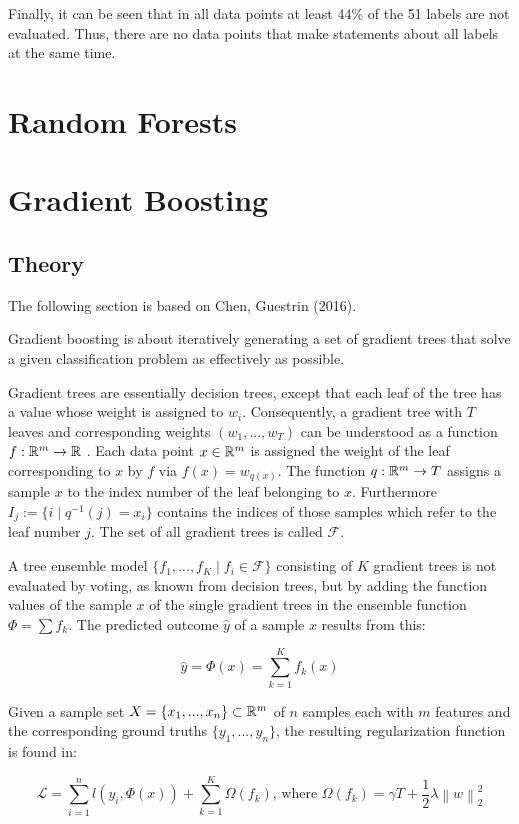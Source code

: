 \documentclass[a4paper,12pt]{scrartcl}
\newcommand{\norm}[1]{\left\| #1 \right\|}
\begin{document}
Finally, it can be seen that in all data points at least 44\% of the 51 labels are not evaluated. Thus, there are no data points that make statements about all labels at the same time.

\section{Random Forests}

\section{Gradient Boosting}
\subsection{Theory}

The following section is based on Chen, Guestrin (2016).

Gradient boosting is about iteratively generating a set of gradient trees that solve a given classification problem as effectively as possible.

Gradient trees are essentially decision trees, except that each leaf of the tree has a value whose weight is assigned to $w_i$. Consequently, a gradient tree with $T$ leaves and corresponding weights $(w_1, ... ,w_T)$ can be understood as a function $f: \mathbb{R}^m \to \mathbb{R}$ . Each data point $x \in \mathbb{R}^m$ is assigned the weight of the leaf corresponding to $x$ by $f$ via $f(x) = w_{q(x)}$. The function $q: \mathbb{R}^m \to T$ assigns a sample $x$ to the index number of the leaf belonging to $x$. Furthermore $I_j := \{ i \mid q^{-1}(j)=x_i \}$ contains the indices of those samples which refer to the leaf number $j$. The set of all gradient trees is called $\mathcal{F}$.

A tree ensemble model $\{f_1, ... ,f_K \mid f_i \in \mathcal{F}\}$ consisting of $K$ gradient trees is not evaluated by voting, as known from decision trees, but by adding the function values of the sample $x$ of the single gradient trees in the ensemble function $\Phi = \sum f_k$. The predicted outcome $\hat{y}$ of a sample $x$ results from this:

$$\hat{y} = \Phi(x) = \sum_{k=1}^{K} f_k(x)$$

Given a sample set $X= \{x_1, ..., x_n\} \subset \mathbb{R}^{m} $ of $n$ samples each with $m$ features and the corresponding ground truths $\{y_1, ... ,y_n\}$, the resulting regularization function is found in:
	
$$\mathcal{L} = \sum_{i=1}^{n} l(y_i, \Phi(x)) + \sum_{k=1}^{K}\Omega(f_k) \text{,  where } \Omega(f_k) = \gamma T + \frac{1}{2}\lambda \norm{w}_2^2$$
\end{document}
